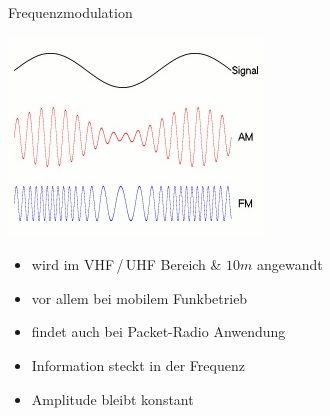 \begin{frame}{Frequenzmodulation}
  \begin{center}
    \includegraphics[width=\textwidth,height=.4\textheight,keepaspectratio]{e14/modulationen.jpg}\\
    {\tiny \hyperlink{refs}{\cite{wm}}}
    \begin{itemize}
      \item wird im VHF\,/\,UHF Bereich \& $10m$ angewandt
      \item vor allem bei mobilem Funkbetrieb
      \item findet auch bei Packet-Radio Anwendung
      \item Information steckt in der Frequenz
      \item Amplitude bleibt konstant
    \end{itemize}
  \end{center}
\end{frame}

